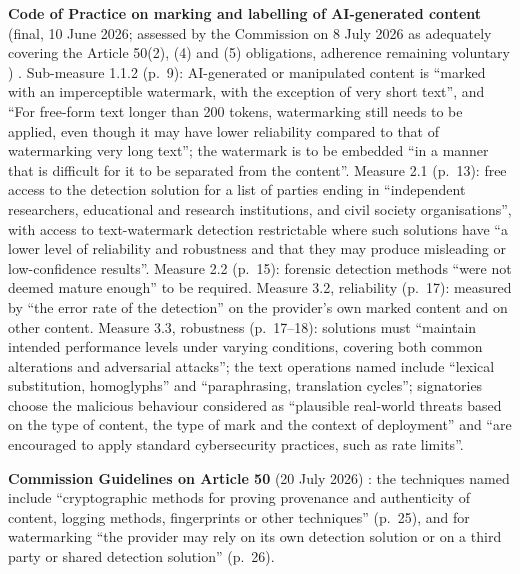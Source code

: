 \documentclass[11pt,letterpaper]{article}
\begin{document}
\textbf{Code of Practice on marking and labelling of AI-generated content} (final, 10 June 2026; assessed by the Commission on 8 July 2026 as adequately covering the Article 50(2), (4) and (5) obligations, adherence remaining voluntary \citep{ec2026opinioncode}) \citep{ec2026codeofpractice}. Sub-measure 1.1.2 (p.~9): AI-generated or manipulated content is ``marked with an imperceptible watermark, with the exception of very short text'', and ``For free-form text longer than 200 tokens, watermarking still needs to be applied, even though it may have lower reliability compared to that of watermarking very long text''; the watermark is to be embedded ``in a manner that is difficult for it to be separated from the content''. Measure 2.1 (p.~13): free access to the detection solution for a list of parties ending in ``independent researchers, educational and research institutions, and civil society organisations'', with access to text-watermark detection restrictable where such solutions have ``a lower level of reliability and robustness and that they may produce misleading or low-confidence results''. Measure 2.2 (p.~15): forensic detection methods ``were not deemed mature enough'' to be required. Measure 3.2, reliability (p.~17): measured by ``the error rate of the detection'' on the provider's own marked content and on other content. Measure 3.3, robustness (p.~17--18): solutions must ``maintain intended performance levels under varying conditions, covering both common alterations and adversarial attacks''; the text operations named include ``lexical substitution, homoglyphs'' and ``paraphrasing, translation cycles''; signatories choose the malicious behaviour considered as ``plausible real-world threats based on the type of content, the type of mark and the context of deployment'' and ``are encouraged to apply standard cybersecurity practices, such as rate limits''.

\textbf{Commission Guidelines on Article 50} (20 July 2026) \citep{ec2026article50guidelines}: the techniques named include ``cryptographic methods for proving provenance and authenticity of content, logging methods, fingerprints or other techniques'' (p.~25), and for watermarking ``the provider may rely on its own detection solution or on a third party or shared detection solution'' (p.~26).
\end{document}
